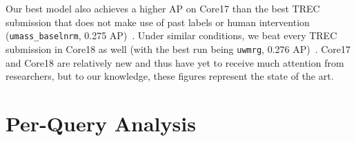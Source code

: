 Our best model also achieves a higher AP on Core17 than the best TREC submission that does not make use of past labels or human intervention (\texttt{umass\_baselnrm}, 0.275 AP)~\cite{allan2017trec}.
Under similar conditions, we beat every TREC submission in Core18 as well (with the best run being \texttt{uwmrg}, 0.276 AP)~\cite{core2018trec}.
Core17 and Core18 are relatively new and thus have yet to receive much attention from researchers, but to our knowledge, these figures represent the state of the art.

\section{Per-Query Analysis}


